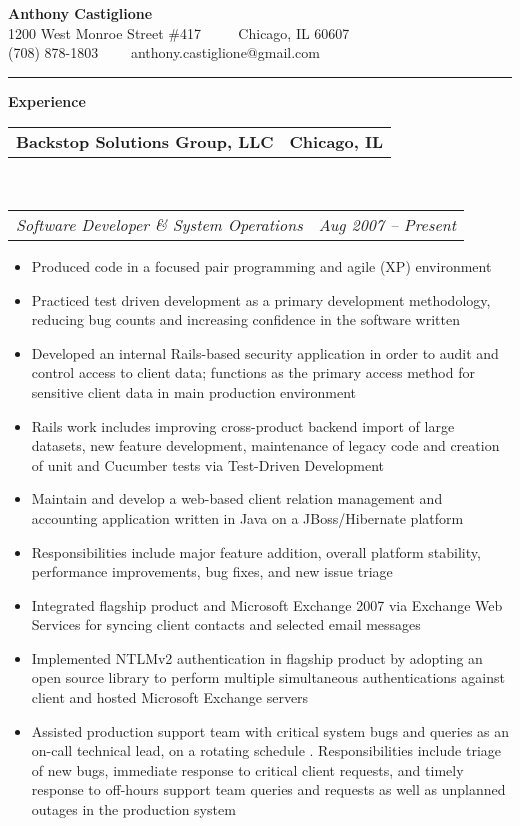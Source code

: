 \documentclass[10pt,letterpaper]{article}
\makeatletter
\newcommand{\headerrow}[2]
{\begin{tabular*}{\linewidth}{l@{\extracolsep{\fill}}r}
	#1 &
	#2 \\
\end{tabular*}}
\newenvironment{indentsection}[1]%
{\begin{list}{}%
	{\setlength{\leftmargin}{#1}}%
	\item[]%
}
{\end{list}}
\makeatother
\begin{document}
\begin{center}
{\LARGE \textbf {Anthony Castiglione}} \\  1200 West Monroe Street \#417 \ \ \textbullet
       \ \ Chicago, IL 60607 \\ (708) 878-1803 \ \ \textbullet \ \ anthony.castiglione@gmail.com
	\end{center}
\hrule
\vspace{0.2in}
{\large \textbf{Experience}}


\begin{indentsection}{\parindent}
	\headerrow
		{\textbf{Backstop Solutions Group, LLC} }
		{\textbf{Chicago, IL}}
	\\
	\headerrow
		{\emph{Software Developer \& System Operations}}
		{\emph{Aug 2007 -- Present}}

	\begin{itemize}
	\renewcommand{\labelitemi}{$-$}
	\vspace{-0.1in}
    \item Produced code in a focused pair programming and agile (XP)
environment
    \item Practiced test driven development as a primary development
methodology, reducing bug counts and increasing confidence in the software
written
		\item Developed an internal Rails-based security application in order to audit and control access to client data; functions as the primary access method for sensitive client data in main production environment
    \item Rails work includes improving cross-product backend import of large
datasets, new feature development, maintenance of legacy code and creation of
unit and Cucumber tests via Test-Driven Development
		\item Maintain and develop a web-based client relation management and accounting application written in Java on a JBoss/Hibernate platform
		\item Responsibilities include major feature addition, overall platform stability, performance improvements, bug fixes, and new issue triage
		\item Integrated flagship product and Microsoft Exchange 2007 via Exchange Web Services for syncing client contacts and selected email messages
		\item Implemented NTLMv2 authentication in flagship product by adopting an open source library to perform multiple simultaneous authentications against client and hosted Microsoft Exchange servers
		\item Assisted production support team with critical system bugs and queries as an on-call technical lead, on a rotating schedule . Responsibilities include triage of new bugs, immediate response to critical client requests, and timely response to off-hours support team queries and requests as well as unplanned outages in the production system
	\end{itemize}
\end{indentsection}
\end{document}
